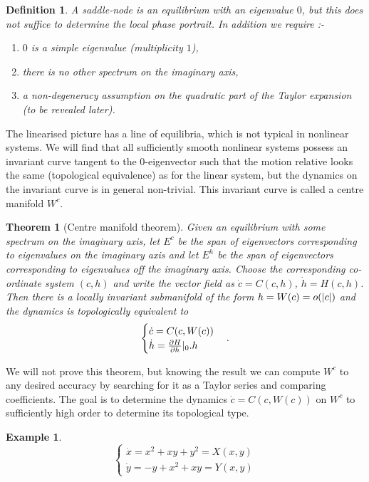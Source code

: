 \documentclass{notes}
\theoremstyle{plain}
\newtheorem*{theorem}{Theorem}
\newtheorem*{definition}{Definition}
\newtheorem*{example}{Example}
\begin{document}
\begin{definition}
A \emph{saddle-node} is an equilibrium with an eigenvalue $0$, but this
does not suffice to determine the local phase portrait.  In addition we
require :-
\begin{enumerate}
\item $0$ is a simple eigenvalue (multiplicity $1$),
\item there is no other spectrum on the imaginary axis,
\item a non-degeneracy assumption on the quadratic part of the Taylor
expansion (to be revealed later).
\end{enumerate}
\end{definition}

The linearised picture has a line of equilibria, which is not typical in
nonlinear systems.  We will find that all sufficiently smooth nonlinear
systems possess an invariant curve tangent to the $0$-eigenvector such
that the motion relative looks the same (topological equivalence) as for
the linear system, but the dynamics on the invariant curve is in general
non-trivial.  This invariant curve is called a centre manifold $W^c$.

\vspace{1in}

\begin{theorem}[Centre manifold theorem]
Given an equilibrium with some spectrum on the imaginary axis, let
$E^c$ be the span of eigenvectors corresponding to eigenvalues on the
imaginary axis and let $E^h$ be the span of eigenvectors corresponding to
eigenvalues off the imaginary axis.  Choose the corresponding co-ordinate
system $(c,h)$ and write the vector field as $\dot{c} = C(c,h)$,
$\dot{h} = H(c,h)$.  Then there is a locally invariant submanifold of the
form $h = W(c) = o(\left|c\right|)$ and the dynamics is topologically
equivalent to
\[
\begin{cases}
\dot{c} = C(c,W(c)) \\
\dot{h} = \frac{\partial H}{\partial h}|_0 . h
\end{cases}.
\]
\end{theorem}

We will not prove this theorem, but knowing the result we can compute
$W^c$ to any desired accuracy by searching for it as a Taylor series
and comparing coefficients.  The goal is to determine the dynamics
$\dot{c} = C(c,W(c))$ on $W^c$ to sufficiently high order to determine
its topological type.

\begin{example}
\[
\begin{cases}
\dot{x} = x^2 + xy + y^2 = X(x,y) \\
\dot{y} = -y + x^2 + xy = Y(x,y)
\end{cases}
\]
\end{example}
\end{document}
